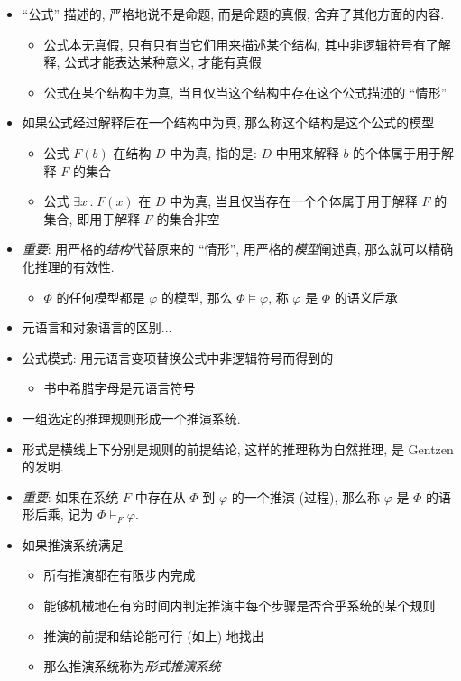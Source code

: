 \documentclass[a4paper]{article}
\begin{document}
\begin{itemize}
\item ``公式'' 描述的, 严格地说不是命题, 而是命题的真假, 舍弃了其他方面的内容. \begin{itemize}
  \item 公式本无真假, 只有只有当它们用来描述某个结构, 其中非逻辑符号有了解释, 公式才能表达某种意义, 才能有真假
  \item 公式在某个结构中为真, 当且仅当这个结构中存在这个公式描述的 ``情形''
  \end{itemize}

\item 如果公式经过解释后在一个结构中为真, 那么称这个结构是这个公式的模型 \begin{itemize}
  \item 公式 $F(b)$ 在结构 $D$ 中为真, 指的是: $D$ 中用来解释 $b$ 的个体属于用于解释 $F$ 的集合
  \item 公式 $\exists x \, .\; F(x)$ 在 $D$ 中为真, 当且仅当存在一个个体属于用于解释 $F$ 的集合, 即用于解释 $F$ 的集合非空
  \end{itemize}

\item \emph{重要}: 用严格的\emph{结构}代替原来的 ``情形'', 用严格的\emph{模型}阐述真, 那么就可以精确化推理的有效性. \begin{itemize}
  \item $\Phi$ 的任何模型都是 $\varphi$ 的模型, 那么 $\Phi \models \varphi$, 称 $\varphi$ 是 $\Phi$ 的语义后承
  \end{itemize}

\item 元语言和对象语言的区别...

\item 公式模式: 用元语言变项替换公式中非逻辑符号而得到的 \begin{itemize}
  \item 书中希腊字母是元语言符号
  \end{itemize}

\item 一组选定的推理规则形成一个推演系统.

\item 形式是横线上下分别是规则的前提结论, 这样的推理称为自然推理, 是 Gentzen 的发明.

\item \emph{重要}: 如果在系统 $F$ 中存在从 $\Phi$ 到 $\varphi$ 的一个推演 (过程), 那么称 $\varphi$ 是 $\Phi$ 的语形后乘, 记为 $\Phi \vdash_{F} \varphi$.

\item 如果推演系统满足 \begin{itemize}
  \item 所有推演都在有限步内完成
  \item 能够机械地在有穷时间内判定推演中每个步骤是否合乎系统的某个规则
  \item 推演的前提和结论能可行 (如上) 地找出
  \item 那么推演系统称为\emph{形式推演系统}
  \end{itemize}


\end{itemize}
\end{document}
